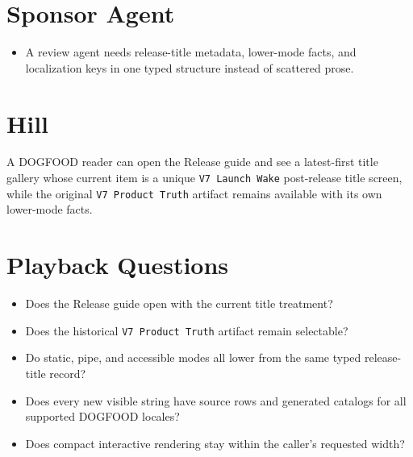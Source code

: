 \section{Sponsor Agent}\label{record-112-sponsor-agent}

\begin{itemize}
\tightlist
\item
  A review agent needs release-title metadata, lower-mode facts, and localization keys in one typed structure instead of scattered prose.
\end{itemize}

\section{Hill}\label{record-112-hill}

A DOGFOOD reader can open the Release guide and see a latest-first title gallery whose current item is a unique \texttt{V\allowbreak{}7\allowbreak{} \allowbreak{}L\allowbreak{}a\allowbreak{}u\allowbreak{}n\allowbreak{}c\allowbreak{}h\allowbreak{} \allowbreak{}W\allowbreak{}a\allowbreak{}k\allowbreak{}e} post-release title screen, while the original \texttt{V\allowbreak{}7\allowbreak{} \allowbreak{}P\allowbreak{}r\allowbreak{}o\allowbreak{}d\allowbreak{}u\allowbreak{}c\allowbreak{}t\allowbreak{} \allowbreak{}T\allowbreak{}r\allowbreak{}u\allowbreak{}t\allowbreak{}h} artifact remains available with its own lower-mode facts.

\section{Playback Questions}\label{record-112-playback-questions}

\begin{itemize}
\tightlist
\item
  Does the Release guide open with the current title treatment?
\item
  Does the historical \texttt{V\allowbreak{}7\allowbreak{} \allowbreak{}P\allowbreak{}r\allowbreak{}o\allowbreak{}d\allowbreak{}u\allowbreak{}c\allowbreak{}t\allowbreak{} \allowbreak{}T\allowbreak{}r\allowbreak{}u\allowbreak{}t\allowbreak{}h} artifact remain selectable?
\item
  Do static, pipe, and accessible modes all lower from the same typed release-title record?
\item
  Does every new visible string have source rows and generated catalogs for all supported DOGFOOD locales?
\item
  Does compact interactive rendering stay within the caller's requested width?
\end{itemize}

